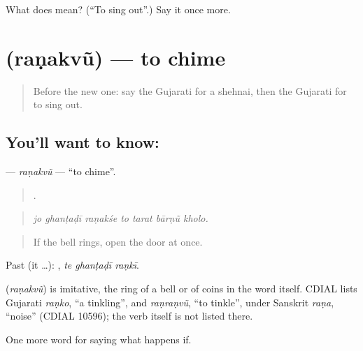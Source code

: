 \begin{tcolorbox}[breakable,colback=teal!4,colframe=teal!35!black,title={Before you move on}]
What does  mean? (\textquotedblleft{}To sing out\textquotedblright{}.) Say it once more.
\end{tcolorbox}
\section[\texorpdfstring{\gu{રણકવું} (raṇakvũ)}{રણકવું (raṇakvũ)}]{ (raṇakvũ) — to chime}

\label{lesson:GU-C553-ranakvu}



\begin{quote}
Before the new one: say the Gujarati for a shehnai, then the Gujarati for to sing out.
\end{quote}

\subsection*{You'll want to know: }
\textbf{} — \emph{raṇakvũ} — \textquotedblleft{}to chime\textquotedblright{}.

\begin{quote}
      .
\end{quote}

\begin{quote}
\emph{jo ghanṭaḍī raṇakśe to tarat bārṇũ kholo.}
\end{quote}

\begin{quote}
If the bell rings, open the door at once.
\end{quote}

Past (it …):   , \emph{te ghanṭaḍī raṇkī}.

\begin{cousinweb}
\textbf{} (\emph{raṇakvũ}) is imitative, the ring of a bell or of coins in the word itself. CDIAL lists Gujarati \emph{raṇko}, \textquotedblleft{}a tinkling\textquotedblright{}, and \emph{raṇraṇvũ}, \textquotedblleft{}to tinkle\textquotedblright{}, under Sanskrit \emph{raṇa}, \textquotedblleft{}noise\textquotedblright{} (CDIAL 10596); the verb itself is not listed there.
\end{cousinweb}

\begin{grammarlens}[title={What you've built}]
One more word for saying what happens if.
\end{grammarlens}

